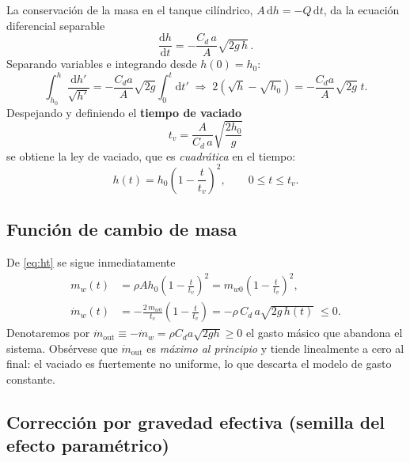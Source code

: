 \documentclass[11pt,a4paper]{article}
\newcommand{\dd}{\mathrm{d}}
\begin{document}
La conservación de la masa en el tanque cilíndrico, $A\,\dd h = -Q\,\dd t$, da la ecuación
diferencial separable
\begin{equation}
\frac{\dd h}{\dd t} = -\frac{C_d\,a}{A}\sqrt{2g\,h}\,.
\label{eq:edoh}
\end{equation}
Separando variables e integrando desde $h(0)=h_0$:
\begin{equation}
\int_{h_0}^{h}\frac{\dd h'}{\sqrt{h'}} = -\frac{C_d a}{A}\sqrt{2g}\int_0^t \dd t'
\;\Longrightarrow\;
2\left(\sqrt h - \sqrt{h_0}\right) = -\frac{C_d a}{A}\sqrt{2g}\;t .
\end{equation}
Despejando y definiendo el \textbf{tiempo de vaciado}
\begin{equation}
\boxed{\;t_v = \frac{A}{C_d\,a}\sqrt{\frac{2h_0}{g}}\;}
\label{eq:tv}
\end{equation}
se obtiene la ley de vaciado, que es \emph{cuadrática} en el tiempo:
\begin{equation}
\boxed{\;h(t) = h_0\left(1-\frac{t}{t_v}\right)^{\!2},\qquad 0\le t\le t_v.\;}
\label{eq:ht}
\end{equation}

\subsection{Función de cambio de masa}

De \eqref{eq:ht} se sigue inmediatamente
\begin{align}
m_w(t) &= \rho A h_0\left(1-\frac{t}{t_v}\right)^{\!2}
       = m_{w0}\left(1-\frac{t}{t_v}\right)^{\!2},
\label{eq:mt}\\[2mm]
\dot m_w(t) &= -\frac{2\,m_{w0}}{t_v}\left(1-\frac{t}{t_v}\right)
            = -\rho\,C_d\,a\sqrt{2g\,h(t)}\;\le 0 .
\label{eq:mdot}
\end{align}
Denotaremos por $\dot m_{\text{out}} \equiv -\dot m_w = \rho C_d a\sqrt{2gh} \ge 0$ el gasto
másico que abandona el sistema. Obsérvese que $\dot m_{\text{out}}$ es \emph{máximo al principio}
y tiende linealmente a cero al final: el vaciado es fuertemente no uniforme, lo que descarta el
modelo de gasto constante.

\subsection{Corrección por gravedad efectiva (semilla del efecto paramétrico)}
\label{sec:geff}
\end{document}
